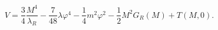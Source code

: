 \begin{equation}\
    V=\frac{3}{4}\frac{M^{4}}{\lambda_{R}}-\frac{7}{48}\lambda
    \varphi^{4}-\frac{1}{4}m^{2}\varphi^{2}-\dfrac{1}{2}M^{2}G_{R}(M)+T(M,0).
\end{equation}

